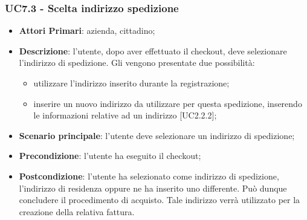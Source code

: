 \subsubsection{UC7.3 - Scelta indirizzo spedizione}
\begin{itemize}
	\item \textbf{Attori Primari}: azienda, cittadino;
	\item \textbf{Descrizione}:
	l'utente, dopo aver effettuato il checkout, deve selezionare l'indirizzo di spedizione. Gli vengono presentate due possibilità:
	\begin{itemize}
		\item utilizzare l'indirizzo inserito durante la registrazione;
		\item inserire un nuovo indirizzo da utilizzare per questa spedizione, inserendo le informazioni relative ad un indirizzo [UC2.2.2];
	\end{itemize}
	\item \textbf{Scenario principale}: l'utente deve selezionare un indirizzo di spedizione;
	\item \textbf{Precondizione}: l'utente ha eseguito il checkout;
	\item \textbf{Postcondizione}:
	l'utente ha selezionato come indirizzo di spedizione, l'indirizzo di 
	residenza oppure ne ha inserito uno differente. Può dunque concludere il 
	procedimento di acquisto. Tale indirizzo verrà utilizzato per la creazione 
	della relativa fattura.
\end{itemize}

